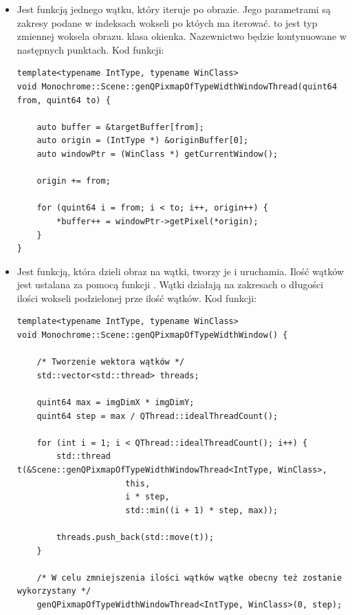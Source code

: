 \begin{itemize}
    \item {}

          Jest funkcją jednego wątku, który iteruje po obrazie.
          Jego parametrami są zakresy podane w indeksach wokseli po któych ma iterować.
           to jest typ zmiennej woksela obrazu.
           klasa okienka.
          Nazewnictwo będzie kontynuowane w następnych punktach.
          Kod funkcji:
          \begin{lstlisting}
template<typename IntType, typename WinClass>
void Monochrome::Scene::genQPixmapOfTypeWidthWindowThread(quint64 from, quint64 to) {

	auto buffer = &targetBuffer[from];
	auto origin = (IntType *) &originBuffer[0];
	auto windowPtr = (WinClass *) getCurrentWindow();

	origin += from;

	for (quint64 i = from; i < to; i++, origin++) {
		*buffer++ = windowPtr->getPixel(*origin);
	}
}
\end{lstlisting}

    \item {}

          Jest funkcją, która dzieli obraz na wątki, tworzy je i uruchamia.
          Ilość wątków jest ustalana za pomocą funkcji .
          Wątki działają na zakresach o długości ilości wokseli podzielonej prze ilość wątków.
          Kod funkcji:
\begin{lstlisting}
template<typename IntType, typename WinClass>
void Monochrome::Scene::genQPixmapOfTypeWidthWindow() {

    /* Tworzenie wektora wątków */
    std::vector<std::thread> threads;

    quint64 max = imgDimX * imgDimY;
    quint64 step = max / QThread::idealThreadCount();

    for (int i = 1; i < QThread::idealThreadCount(); i++) {
        std::thread t(&Scene::genQPixmapOfTypeWidthWindowThread<IntType, WinClass>,
                      this,
                      i * step,
                      std::min((i + 1) * step, max));

        threads.push_back(std::move(t));
    }

    /* W celu zmniejszenia ilości wątków wątke obecny też zostanie wykorzystany */
    genQPixmapOfTypeWidthWindowThread<IntType, WinClass>(0, step);


\end{lstlisting}
\end{itemize}
